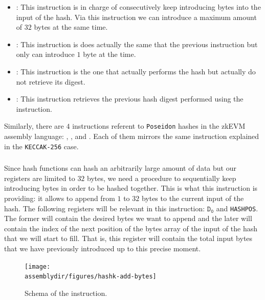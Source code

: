 \begin{itemize}

\item \HASHK: This instruction is in charge of consecutively keep introducing bytes into the input of the hash. Via this instruction we can introduce a maximum amount of $32$ bytes at the same time. 

\item \HASHKONE: This instruction is does actually the same that the previous instruction but only can introduce $1$ byte at the time. 

\item \HASHKLEN: This instruction is the one that actually performs the hash but actually do not retrieve its digest. 

\item \HASHKDIGEST: This instruction retrieves the previous hash digest performed using the \HASHKLEN instruction. 

\end{itemize}

Similarly, there are $4$ instructions referent to \texttt{Poseidon} hashes in the zkEVM assembly language: \HASHP, \HASHPONE, \HASHPLEN and \HASHPDIGEST. Each of them mirrors the same instruction explained in the \texttt{KECCAK-256} case. 



\subsubsection{\HASHK}

Since hash functions can hash an arbitrarily large amount of data but our registers are limited to $32$ bytes, we need a procedure to sequentially keep introducing bytes in order to be hashed together. This is what this instruction is providing: it allows to append from $1$ to $32$ bytes to the current input of the hash. The following registers will be relevant in this instruction: $\mathtt{D_0}$ and \texttt{HASHPOS}. The former will contain the desired bytes we want to append and the later will contain the index of the next position of the bytes array of the input of the hash that we will start to fill. That is, this register will contain the total input bytes that we have previously introduced up to this precise moment. 

\begin{figure}[H]
\centering
\texttt{[image: \\assemblydir/figures/hashk-add-bytes]}
\caption{Schema of the \HASHK instruction.}
\label{fig:hashk-add-bytes}
\end{figure}

